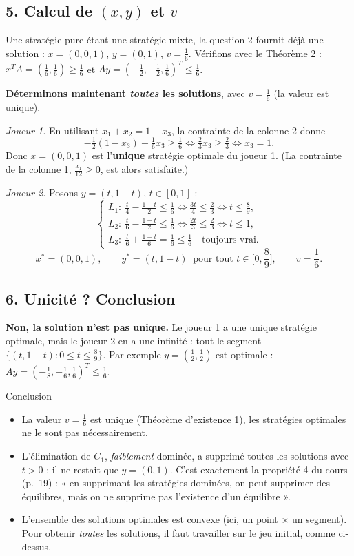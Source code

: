 \documentclass[11pt,a4paper]{article}
\begin{document}
\subsection*{5. Calcul de $(x,y)$ et $v$}
Une stratégie pure étant une stratégie mixte, la question 2 fournit déjà une solution : $x=(0,0,1)$, $y=(0,1)$, $v=\frac16$. Vérifions avec le Théorème 2 : $x^TA=(\frac16,\frac16)\ge\frac16$ et $Ay=(-\frac12,-\frac12,\frac16)^T\le\frac16$. \checkmark

\textbf{Déterminons maintenant \emph{toutes} les solutions}, avec $v=\frac16$ (la valeur est unique).

\emph{Joueur 1.} En utilisant $x_1+x_2=1-x_3$, la contrainte de la colonne 2 donne
\[
-\tfrac12(1-x_3)+\tfrac16x_3\ge\tfrac16\iff\tfrac23x_3\ge\tfrac23\iff x_3=1.
\]
Donc $x=(0,0,1)$ est l'\textbf{unique} stratégie optimale du joueur 1. (La contrainte de la colonne 1, $\frac{x_1}{12}\ge0$, est alors satisfaite.)

\emph{Joueur 2.} Posons $y=(t,1-t)$, $t\in[0,1]$ :
\[
\begin{cases}
L_1:\ \frac t4-\frac{1-t}{2}\le\frac16\iff\frac{3t}{4}\le\frac23\iff t\le\frac89,\\[1mm]
L_2:\ \frac t6-\frac{1-t}{2}\le\frac16\iff\frac{2t}{3}\le\frac23\iff t\le1,\\[1mm]
L_3:\ \frac t6+\frac{1-t}{6}=\frac16\le\frac16\quad\text{toujours vrai.}
\end{cases}
\]
\[
\boxed{x^*=(0,0,1),\qquad y^*=(t,1-t)\ \text{ pour tout } t\in\Big[0,\frac89\Big],\qquad v=\frac16.}
\]

\subsection*{6. Unicité ? Conclusion}
\textbf{Non, la solution n'est pas unique.} Le joueur 1 a une unique stratégie optimale, mais le joueur 2 en a une infinité : tout le segment $\{(t,1-t):0\le t\le\frac89\}$. Par exemple $y=(\frac12,\frac12)$ est optimale : $Ay=(-\frac18,-\frac16,\frac16)^T\le\frac16$.

\begin{rembox}{Conclusion}
\begin{itemize}[leftmargin=*]
\item La valeur $v=\frac16$ est unique (Théorème d'existence 1), les stratégies optimales ne le sont pas nécessairement.
\item L'élimination de $C_1$, \emph{faiblement} dominée, a supprimé toutes les solutions avec $t>0$ : il ne restait que $y=(0,1)$. C'est exactement la propriété 4 du cours (p.~19) : « en supprimant les stratégies dominées, on peut supprimer des équilibres, mais on ne supprime pas l'existence d'un équilibre ».
\item L'ensemble des solutions optimales est convexe (ici, un point $\times$ un segment). Pour obtenir \emph{toutes} les solutions, il faut travailler sur le jeu initial, comme ci-dessus.
\end{itemize}
\end{rembox}
\end{document}
